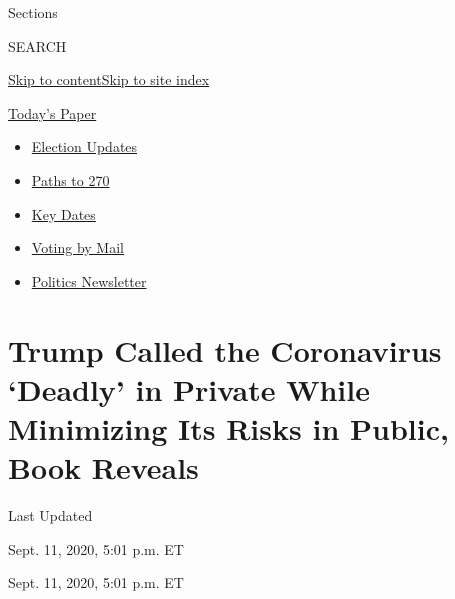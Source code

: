 Sections

SEARCH

\protect\hyperlink{site-content}{Skip to
content}\protect\hyperlink{site-index}{Skip to site index}

\href{https://myaccount.nytimes3xbfgragh.onion/auth/login?response_type=cookie\&client_id=vi}{}

\href{https://www.nytimes3xbfgragh.onion/section/todayspaper}{Today's
Paper}

\begin{itemize}
\item
  \href{https://www.nytimes3xbfgragh.onion/live/2020/09/11/us/trump-vs-biden?action=click\&pgtype=Article\&state=default\&region=TOP_BANNER\&context=storylines_menu}{Election
  Updates}
\item
  \href{https://www.nytimes3xbfgragh.onion/interactive/2020/us/elections/election-states-biden-trump.html?action=click\&pgtype=Article\&state=default\&region=TOP_BANNER\&context=storylines_menu}{Paths
  to 270}
\item
  \href{https://www.nytimes3xbfgragh.onion/interactive/2019/us/elections/2020-presidential-election-calendar.html?action=click\&pgtype=Article\&state=default\&region=TOP_BANNER\&context=storylines_menu}{Key
  Dates}
\item
  \href{https://www.nytimes3xbfgragh.onion/interactive/2020/08/31/us/politics/vote-by-mail-deadlines.html?action=click\&pgtype=Article\&state=default\&region=TOP_BANNER\&context=storylines_menu}{Voting
  by Mail}
\item
  \href{https://www.nytimes3xbfgragh.onion/newsletters/politics?action=click\&pgtype=Article\&state=default\&region=TOP_BANNER\&context=storylines_menu}{Politics
  Newsletter}
\end{itemize}

\hypertarget{trump-called-the-coronavirus-deadly-in-private-while-minimizing-its-risks-in-public-book-reveals}{%
\section{Trump Called the Coronavirus `Deadly' in Private While
Minimizing Its Risks in Public, Book
Reveals}\label{trump-called-the-coronavirus-deadly-in-private-while-minimizing-its-risks-in-public-book-reveals}}

Last Updated

Sept. 11, 2020, 5:01 p.m. ET

Sept. 11, 2020, 5:01 p.m. ET

